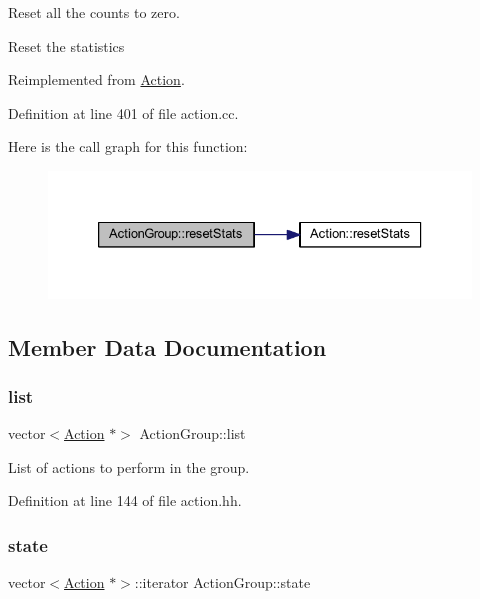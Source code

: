 Reset all the counts to zero. 

Reset the statistics 

Reimplemented from \mbox{\hyperlink{class_action_a8ac616ae7f497202746a92c95e32821d}{Action}}.



Definition at line 401 of file action.\+cc.

Here is the call graph for this function\+:
\nopagebreak
\begin{figure}[H]
\begin{center}
\leavevmode
\includegraphics[width=333pt]{class_action_group_a536ed9307295585894a5f083415f2f77_cgraph}
\end{center}
\end{figure}


\subsection{Member Data Documentation}
\mbox{\label{class_action_group_a2490d195adbf5542c17f3a751afc31c1}} 
\subsubsection{\texorpdfstring{list}{list}}
{\footnotesize\ttfamily vector$<$\mbox{\hyperlink{class_action}{Action}} $\ast$$>$ Action\+Group\+::list\hspace{0.3cm}{\ttfamily [protected]}}



List of actions to perform in the group. 



Definition at line 144 of file action.\+hh.

\mbox{\label{class_action_group_a7989aa415058903bd2bd3f06227e9ea1}} 
\subsubsection{\texorpdfstring{state}{state}}
{\footnotesize\ttfamily vector$<$\mbox{\hyperlink{class_action}{Action}} $\ast$$>$\+::iterator Action\+Group\+::state\hspace{0.3cm}{\ttfamily [protected]}}



